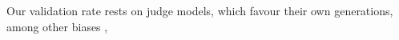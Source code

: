 Our validation rate rests on judge models, which favour their own
generations, among other biases
\citep{panickssery2024selfrecognition,wataoka2024selfpreference,zheng2023judging},
